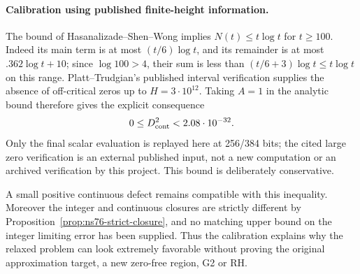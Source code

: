 \paragraph{Calibration using published finite-height information.}
The bound of Hasanalizade--Shen--Wong
\cite[Corollary 1.2]{HasanalizadeShenWong2021} implies
$N(t)\leq t\log t$ for $t\geq100$. Indeed its main term is at most
$(t/6)\log t$, and its remainder is at most
$.362\log t+10$; since $\log100>4$, their sum is less than
$(t/6+3)\log t\leq t\log t$ on this range.
Platt--Trudgian's published interval verification
\cite[Theorem 1]{PlattTrudgian2021} supplies the absence of off-critical
zeros up to $H=3\cdot10^{12}$. Taking $A=1$ in the analytic bound
therefore gives the explicit consequence
\begin{equation}
 0\leq D_{\rm cont}^2<2.08\cdot10^{-32}.
 \label{eq:ns77-published-calibration}
\end{equation}
Only the final scalar evaluation is replayed here at 256/384 bits;
the cited large zero verification is an external published input,
not a new computation or an archived verification by this project.
This bound is deliberately conservative.

A small positive continuous defect remains compatible with this
inequality. Moreover the integer and continuous closures are strictly
different by Proposition~\ref{prop:ns76-strict-closure}, and no matching
upper bound on the integer limiting error has been supplied.
Thus the calibration explains why the relaxed problem can look
extremely favorable without proving the original approximation target,
a new zero-free region, G2 or RH.
